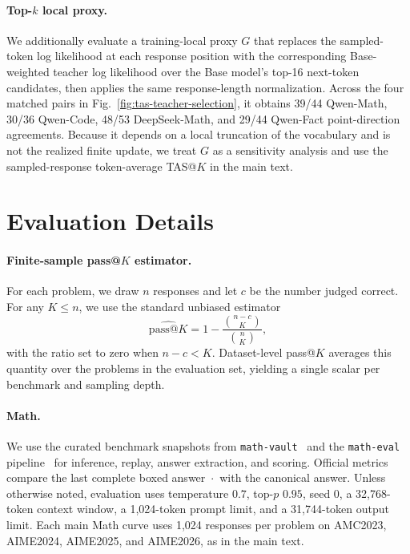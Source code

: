 \documentclass{article}
\theoremstyle{opdplain}
\begin{document}
\paragraph{Top-$k$ local proxy.}
We additionally evaluate a training-local proxy $G$ that replaces the sampled-token log likelihood at each response position with the corresponding Base-weighted teacher log likelihood over the Base model's top-16 next-token candidates, then applies the same response-length normalization.
Across the four matched pairs in Fig.~\ref{fig:tas-teacher-selection}, it obtains 39/44 Qwen-Math, 30/36 Qwen-Code, 48/53 DeepSeek-Math, and 29/44 Qwen-Fact point-direction agreements.
Because it depends on a local truncation of the vocabulary and is not the realized finite update, we treat $G$ as a sensitivity analysis and use the sampled-response token-average TAS@$K$ in the main text.

\section{Evaluation Details}
\label{app:evaluation-details}

\paragraph{Finite-sample pass@$K$ estimator.}
For each problem, we draw $n$ responses and let $c$ be the number judged correct.
For any $K\le n$, we use the standard unbiased estimator~\citep{chen2021codex}
\begin{equation}
    \widehat{\mathrm{pass}@K}
    =1-\frac{\binom{n-c}{K}}{\binom{n}{K}},
\end{equation}
with the ratio set to zero when $n-c<K$.
Dataset-level pass@$K$ averages this quantity over the problems in the evaluation set, yielding a single scalar per benchmark and sampling depth.

\paragraph{Math.}
We use the curated benchmark snapshots from \texttt{math-vault}~\citep{ge_math_vault_2026} and the
\texttt{math-eval} pipeline~\citep{ge_math_eval_2026} for inference, replay, answer extraction, and scoring.
Official metrics compare the last complete boxed answer
\(\boxed{\cdot}\)
with the canonical answer.
Unless otherwise noted, evaluation uses temperature \(0.7\), top-\(p\) \(0.95\), seed \(0\), a 32,768-token context window, a 1,024-token prompt limit, and a 31,744-token output limit.
Each main Math curve uses 1,024 responses per problem on AMC2023, AIME2024, AIME2025, and AIME2026, as in the main text.
\end{document}
